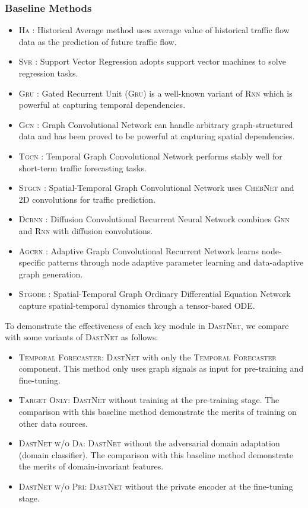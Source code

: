 \documentclass[sigconf]{acmart}
\theoremstyle{definition}
\begin{document}
\subsubsection{Baseline Methods}
\begin{itemize}[leftmargin=*]
    \item \textsc{Ha} \cite{liu2004summary}: Historical Average method uses average value of historical traffic flow data as the prediction of future traffic flow.
    \item \textsc{Svr} \cite{smola2004tutorial}: Support Vector Regression adopts support vector machines to solve regression tasks.
    \item \textsc{Gru} \cite{cho2014properties}: Gated Recurrent Unit (\textsc{Gru}) is a well-known variant of \textsc{Rnn} which is powerful at capturing temporal dependencies.
    \item \textsc{Gcn} \cite{kipf2016semi}: Graph Convolutional Network can handle arbitrary graph-structured data and has been proved to be powerful at capturing spatial dependencies.
    \item \textsc{Tgcn} \cite{zhao2019t}: Temporal Graph Convolutional Network performs stably well for short-term traffic forecasting tasks.
    \item \textsc{Stgcn} \cite{yu2017spatio}: Spatial-Temporal Graph Convolutional Network uses \textsc{ChebNet} and 2D convolutions for traffic prediction.
    \item \textsc{Dcrnn} \cite{li2017diffusion}: Diffusion Convolutional Recurrent Neural Network combines \textsc{Gnn} and \textsc{Rnn} with diffusion convolutions.
    \item \textsc{Agcrn} \cite{bai2020adaptive}: Adaptive Graph Convolutional Recurrent Network learns node-specific patterns through node adaptive parameter learning and data-adaptive graph generation.
    \item \textsc{Stgode} \cite{fang2021spatial}: Spatial-Temporal Graph Ordinary Differential Equation Network capture spatial-temporal dynamics through a tensor-based ODE.
\end{itemize}
To demonstrate the effectiveness of each key module in \textsc{DastNet}, we compare with some variants of \textsc{DastNet} as follows:

\begin{itemize}[leftmargin=*]
    \item \textsc{Temporal Forecaster}: \textsc{DastNet} with only the \textsc{Temporal Forecaster} component. This method only uses graph signals as input for pre-training and fine-tuning.
    \item \textsc{Target Only}: \textsc{DastNet} without training at the pre-training stage. The comparison with this baseline method demonstrate the merits of training on other data sources.
    \item \textsc{DastNet  w/o Da}: \textsc{DastNet} without the adversarial domain adaptation (domain classifier).  The comparison with this baseline method demonstrate the merits of domain-invariant features.
    \item \textsc{DastNet  w/o Pri}: \textsc{DastNet} without the private encoder at the fine-tuning stage.
\end{itemize}
\end{document}
